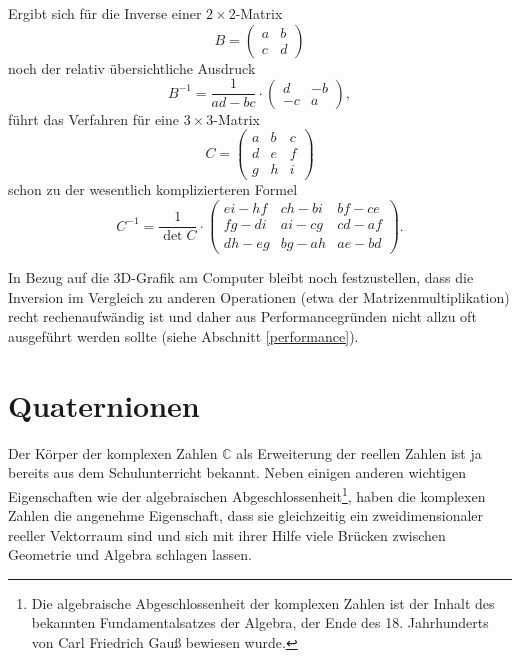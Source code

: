 Ergibt sich für die Inverse einer $2 \times 2$-Matrix
\begin{equation}
 B = \begin{pmatrix}
  a & b \\
  c & d
 \end{pmatrix}
\end{equation}
noch der relativ übersichtliche Ausdruck
\begin{equation}
 B^{-1} = \frac{1}{ad-bc} \cdot
 \begin{pmatrix}
  d & -b \\
  -c & a
 \end{pmatrix},
\end{equation}
führt das Verfahren für eine $3 \times 3$-Matrix
\begin{equation}
 C = \begin{pmatrix}
  a & b & c \\
  d & e & f \\
  g & h & i
 \end{pmatrix}
\end{equation}
schon zu der wesentlich komplizierteren Formel
\begin{equation}
 C^{-1} = \frac{1}{\det C} \cdot
 \begin{pmatrix}
  ei - hf & ch - bi & bf - ce \\
  fg - di & ai - cg & cd - af \\
  dh - eg & bg - ah & ae - bd
 \end{pmatrix}.
\end{equation}

In Bezug auf die 3D-Grafik am Computer bleibt noch festzustellen, dass die Inversion im Vergleich zu anderen Operationen (etwa der Matrizenmultiplikation) recht rechenaufwändig ist und daher aus Performancegründen nicht allzu oft ausgeführt werden sollte (siehe Abschnitt \ref{performance}).

\section{Quaternionen}
\label{quaternionmath}
Der Körper der komplexen Zahlen $\mathbb C$ als Erweiterung der reellen Zahlen ist ja bereits aus dem Schulunterricht bekannt. Neben einigen anderen wichtigen Eigenschaften wie der algebraischen Abgeschlossenheit\footnote{Die algebraische Abgeschlossenheit der komplexen Zahlen ist der Inhalt des bekannten Fundamentalsatzes der Algebra, der Ende des 18. Jahrhunderts von Carl Friedrich Gauß bewiesen wurde.}, haben die komplexen Zahlen die angenehme Eigenschaft, dass sie gleichzeitig ein zweidimensionaler reeller Vektorraum sind und sich mit ihrer Hilfe viele Brücken zwischen Geometrie und Algebra schlagen lassen.

